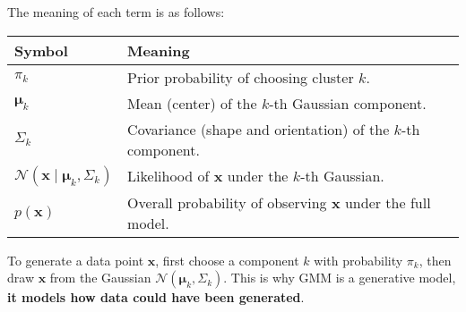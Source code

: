 \noindent
The meaning of each term is as follows:
\begin{table}[!htp]
    \centering
    \begin{tabular}{@{} l l @{}}
        \toprule
        Symbol                                                      & Meaning                                                               \\
        \midrule
        $\pi_{k}$                                                   & Prior probability of choosing cluster $k$.                            \\ [.5em]
        $\boldsymbol{\mu}_{k}$                                      & Mean (center) of the $k$-th Gaussian component.                       \\ [.5em]
        $\Sigma_{k}$                                                & Covariance (shape and orientation) of the $k$-th component.           \\ [.5em]
        $\mathcal{N}(\mathbf{x} \mid \boldsymbol{\mu}_k, \Sigma_k)$ & Likelihood of $\mathbf{x}$ under the $k$-th Gaussian.                 \\ [.5em]
        $p(\mathbf{x})$                                             & Overall probability of observing $\mathbf{x}$ under the full model.   \\
        \bottomrule
    \end{tabular}
\end{table}

\noindent
To generate a data point $\mathbf{x}$, first choose a component $k$ with probability $\pi_k$, then draw $\mathbf{x}$ from the Gaussian $\mathcal{N}(\boldsymbol{\mu}_k, \Sigma_k)$. This is why GMM is a generative model, \textbf{it models how data could have been generated}.